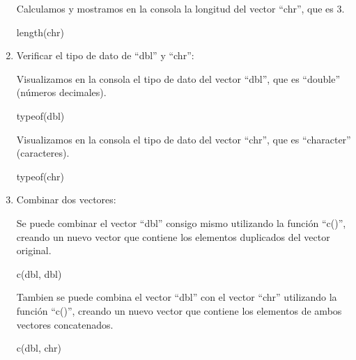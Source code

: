 \documentclass[
  jou,
  floatsintext,
  longtable,
  a4paper,
  nolmodern,
  notxfonts,
  notimes,
  colorlinks=true,linkcolor=blue,citecolor=blue,urlcolor=blue]{apa7}
\newenvironment{Shaded}{\begin{snugshade}}{\end{snugshade}}
\newcommand{\FunctionTok}[1]{\textcolor[rgb]{0.28,0.35,0.67}{#1}}
\newcommand{\NormalTok}[1]{\textcolor[rgb]{0.00,0.23,0.31}{#1}}
\begin{document}
\begin{enumerate}
  Calculamos y mostramos en la consola la longitud del vector ``chr'',
  que es 3.

\begin{Shaded}
\begin{Highlighting}[]
\FunctionTok{length}\NormalTok{(chr)}
\end{Highlighting}
\end{Shaded}
\item
  Verificar el tipo de dato de ``dbl'' y ``chr'':

  Visualizamos en la consola el tipo de dato del vector ``dbl'', que es
  ``double'' (números decimales).

\begin{Shaded}
\begin{Highlighting}[]
\FunctionTok{typeof}\NormalTok{(dbl)}
\end{Highlighting}
\end{Shaded}

  Visualizamos en la consola el tipo de dato del vector ``chr'', que es
  ``character'' (caracteres).

\begin{Shaded}
\begin{Highlighting}[]
\FunctionTok{typeof}\NormalTok{(chr)}
\end{Highlighting}
\end{Shaded}
\item
  Combinar dos vectores:

  Se puede combinar el vector ``dbl'' consigo mismo utilizando la
  función ``c()'', creando un nuevo vector que contiene los elementos
  duplicados del vector original.

\begin{Shaded}
\begin{Highlighting}[]
\FunctionTok{c}\NormalTok{(dbl, dbl)}
\end{Highlighting}
\end{Shaded}

  Tambien se puede combina el vector ``dbl'' con el vector ``chr''
  utilizando la función ``c()'', creando un nuevo vector que contiene
  los elementos de ambos vectores concatenados.

\begin{Shaded}
\begin{Highlighting}[]
\FunctionTok{c}\NormalTok{(dbl, chr)}
\end{Highlighting}
\end{Shaded}
\end{enumerate}
\end{document}
